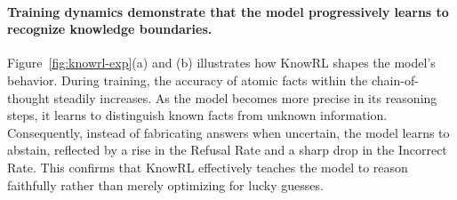\paragraph{Training dynamics demonstrate that the model progressively learns to recognize knowledge boundaries.}
Figure~\ref{fig:knowrl-exp}(a) and (b) illustrates how KnowRL shapes the model's behavior. 
During training, the accuracy of atomic facts within the chain-of-thought steadily increases. 
As the model becomes more precise in its reasoning steps, it learns to distinguish known facts from unknown information. 
Consequently, instead of fabricating answers when uncertain, the model learns to abstain, reflected by a rise in the Refusal Rate and a sharp drop in the Incorrect Rate. 
This confirms that KnowRL effectively teaches the model to reason faithfully rather than merely optimizing for lucky guesses.









